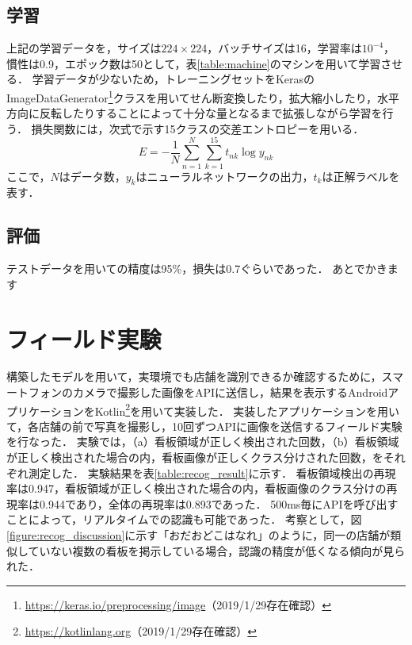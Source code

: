   \subsection{学習}
    上記の学習データを，サイズは$224 \times 224$，バッチサイズは16，学習率は$10^{-4}$，慣性は0.9，エポック数は50として，表\ref{table:machine}のマシンを用いて学習させる．
    学習データが少ないため，トレーニングセットをKerasのImageDataGenerator\footnote{\url{https://keras.io/preprocessing/image}（2019/1/29存在確認）}クラスを用いてせん断変換したり，拡大縮小したり，水平方向に反転したりすることによって十分な量となるまで拡張しながら学習を行う．
    損失関数には，次式で示す15クラスの交差エントロピーを用いる．
    \begin{equation}
      E = -\frac{1}{N} \sum_{n=1}^{N} \sum_{k=1}^{15} t_{nk} \log y_{nk}
    \end{equation}
    ここで，$N$はデータ数，$y_k$はニューラルネットワークの出力，$t_k$は正解ラベルを表す．

  \subsection{評価}
    テストデータを用いての精度は95\%，損失は0.7ぐらいであった．
    あとでかきます


\section{フィールド実験}
  構築したモデルを用いて，実環境でも店舗を識別できるか確認するために，スマートフォンのカメラで撮影した画像をAPIに送信し，結果を表示するAndroidアプリケーションをKotlin\footnote{\url{https://kotlinlang.org}（2019/1/29存在確認）}を用いて実装した．
  実装したアプリケーションを用いて，各店舗の前で写真を撮影し，10回ずつAPIに画像を送信するフィールド実験を行なった．
  実験では，（a）看板領域が正しく検出された回数，（b）看板領域が正しく検出された場合の内，看板画像が正しくクラス分けされた回数，をそれぞれ測定した．
  実験結果を表\ref{table:recog_result}に示す．
  看板領域検出の再現率は0.947，看板領域が正しく検出された場合の内，看板画像のクラス分けの再現率は0.944であり，全体の再現率は0.893であった．
  500ms毎にAPIを呼び出すことによって，リアルタイムでの認識も可能であった．
  考察として，図\ref{figure:recog_discussion}に示す「おだおどこはなれ」のように，同一の店舗が類似していない複数の看板を掲示している場合，認識の精度が低くなる傾向が見られた．


